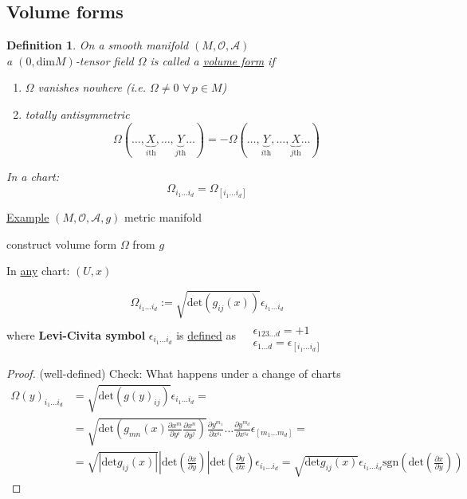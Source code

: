 \documentclass[10pt, twoside]{amsart}
\newtheorem{definition}{Definition}
\begin{document}
\begin{multicols*}{2}
\subsection{}

\subsection{Volume forms}

\begin{definition}
On a smooth manifold $(M,\mathcal{O},\mathcal{A})$ \\
a $(0,\text{dim}M)$-tensor field $\Omega$ is called a \underline{volume form} if 
\begin{enumerate}
\item[(a)] $\Omega$ vanishes nowhere (i.e. $\Omega \neq 0 \, \, \forall \, p \in M$) 
\item[(b)] totally antisymmetric 
\[
\Omega(\dots , \underbrace{X}_{i\text{th}} , \dots , \underbrace{Y}_{j\text{th}} \dots ) = - \Omega(\dots , \underbrace{Y}_{i\text{th}} , \dots , \underbrace{X}_{j\text{th}} \dots )
\]
\end{enumerate}

In a chart: 
\[
\Omega_{i_1 \dots i_d} = \Omega_{ [i_1 \dots i_d ]}
\]
\end{definition}

\underline{Example} $(M,\mathcal{O}, \mathcal{A},g)$ metric manifold

construct volume form $\Omega$ from $g$

In \underline{any} chart: $(U,x)$

\[
\Omega_{i_1 \dots i_d} := \sqrt{ \text{det}(g_{ij}(x)) } \epsilon_{i_1 \dots i_d} 
\]
where \textbf{Levi-Civita symbol} $\epsilon_{i_1 \dots i_d}$ is \underline{defined} as $\begin{aligned} & \quad \\ 
& \epsilon_{123 \dots d} = +1 \\ 
& \epsilon_{1\dots d} = \epsilon_{[i_1 \dots i_d]} \end{aligned}$

\begin{proof} (well-defined) Check: What happens under a change of charts
\[
\begin{aligned}
\Omega(y)_{i_1 \dots i_d} & = \sqrt{ \text{det}(g(y)_{ij}) } \epsilon_{i_1 \dots i_d} = \\
& = \sqrt{ \text{det}(g_{mn}(x) \frac{ \partial x^m}{ \partial y^i} \frac{ \partial x^n}{ \partial y^j} )} \frac{ \partial y^{m_1} }{ \partial x^{i_1} } \dots \frac{ \partial y^{m_d}}{ \partial x^{i_d}} \epsilon_{ [m_1 \dots m_d] } = \\
& = \sqrt{ | \text{det}g_{ij}(x) | } \left| \text{det}\left( \frac{ \partial x}{ \partial y} \right) \right| \text{det}\left( \frac{ \partial y}{ \partial x} \right) \epsilon_{i_1 \dots i_d} = \sqrt{ \text{det}g_{ij}(x)} \epsilon_{i_1 \dots i_d} \text{sgn}\left( \text{det}\left( \frac{ \partial x}{ \partial y} \right) \right)
\end{aligned}
\]
\end{proof}


\end{multicols*}
\end{document}
